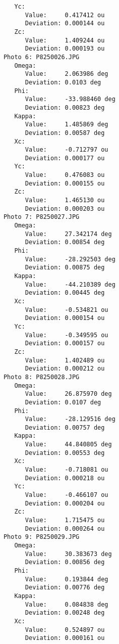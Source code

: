 \documentclass{article}
\begin{document}
\begin{verbatim}
               Yc:
                  Value:     0.417412 ou
                  Deviation: 0.000144 ou
               Zc:
                  Value:     1.409244 ou
                  Deviation: 0.000193 ou
            Photo 6: P8250026.JPG
               Omega:
                  Value:     2.063986 deg
                  Deviation: 0.0103 deg
               Phi:
                  Value:     -33.988460 deg
                  Deviation: 0.00823 deg
               Kappa:
                  Value:     1.485869 deg
                  Deviation: 0.00587 deg
               Xc:
                  Value:     -0.712797 ou
                  Deviation: 0.000177 ou
               Yc:
                  Value:     0.476083 ou
                  Deviation: 0.000155 ou
               Zc:
                  Value:     1.465130 ou
                  Deviation: 0.000203 ou
            Photo 7: P8250027.JPG
               Omega:
                  Value:     27.342174 deg
                  Deviation: 0.00854 deg
               Phi:
                  Value:     -28.292503 deg
                  Deviation: 0.00875 deg
               Kappa:
                  Value:     -44.210389 deg
                  Deviation: 0.00445 deg
               Xc:
                  Value:     -0.534821 ou
                  Deviation: 0.000154 ou
               Yc:
                  Value:     -0.349595 ou
                  Deviation: 0.000157 ou
               Zc:
                  Value:     1.402489 ou
                  Deviation: 0.000212 ou
            Photo 8: P8250028.JPG
               Omega:
                  Value:     26.875970 deg
                  Deviation: 0.0107 deg
               Phi:
                  Value:     -28.129516 deg
                  Deviation: 0.00757 deg
               Kappa:
                  Value:     44.840805 deg
                  Deviation: 0.00553 deg
               Xc:
                  Value:     -0.718081 ou
                  Deviation: 0.000218 ou
               Yc:
                  Value:     -0.466107 ou
                  Deviation: 0.000204 ou
               Zc:
                  Value:     1.715475 ou
                  Deviation: 0.000264 ou
            Photo 9: P8250029.JPG
               Omega:
                  Value:     30.383673 deg
                  Deviation: 0.00856 deg
               Phi:
                  Value:     0.193844 deg
                  Deviation: 0.00776 deg
               Kappa:
                  Value:     0.084838 deg
                  Deviation: 0.00248 deg
               Xc:
                  Value:     0.524897 ou
                  Deviation: 0.000161 ou

\end{verbatim}
\end{document}
